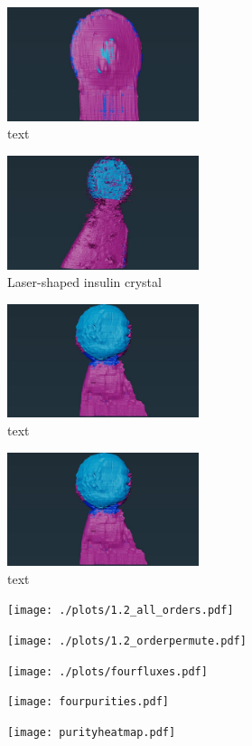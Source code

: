 \begin{figure}
	\includegraphics[width=0.5\textwidth]{images/avizo_flats/ins_con.jpg}
	\caption{text}
 \label{ins_control}
\end{figure}
\begin{figure}
	\includegraphics[width=0.5\textwidth]{images/avizo_flats/ins_ls.jpg}
	\caption{Laser-shaped insulin crystal}
 \label{ins_lasershaped}
\end{figure}

\begin{figure}
	\includegraphics[width=0.5\textwidth]{images/avizo_flats/prot_ls.jpg}
	\caption{text}
\end{figure}
\begin{figure}
	\includegraphics[width=0.5\textwidth]{images/avizo_flats/prot_ls.jpg}
	\caption{text}
\end{figure}


\onecolumn
\begin{figure}
	\centering
	\texttt{[image: ./plots/1.2\_all\_orders.pdf]}
\end{figure}
\begin{figure}
	\texttt{[image: ./plots/1.2\_orderpermute.pdf]}
\end{figure}
\begin{figure}
	\centering
	\texttt{[image: ./plots/fourfluxes.pdf]}
\end{figure}
\begin{figure}
	\texttt{[image: fourpurities.pdf]}
\end{figure}
\begin{figure}
	\texttt{[image: purityheatmap.pdf]}
\end{figure}